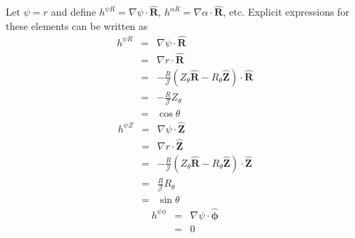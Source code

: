 \documentclass{article}
\newcommand{\tmmathbf}[1]{\ensuremath{\boldsymbol{#1}}}
\begin{document}
Let $\psi = r$ and define $h^{\psi R} = \nabla \psi \cdot \hat{\mathbf{R}}$,
$h^{\alpha R} = \nabla \alpha \cdot \hat{\mathbf{R}}$, etc. Explicit
expressions for these elements can be written as
\begin{eqnarray}
  h^{\psi R} & = & \nabla \psi \cdot \hat{\mathbf{R}} \nonumber\\
  & = & \nabla r \cdot \hat{\mathbf{R}} \nonumber\\
  & = & - \frac{R}{\mathcal{J}} (Z_{\theta} \hat{\mathbf{R}} - R_{\theta}
  \hat{\mathbf{Z}}) \cdot \hat{\mathbf{R}} \nonumber\\
  & = & - \frac{R}{\mathcal{J}} Z_{\theta} \nonumber\\
  & = & \cos \theta 
\end{eqnarray}
\begin{eqnarray*}
  h^{\psi Z} & = & \nabla \psi \cdot \hat{\mathbf{Z}}\\
  & = & \nabla r \cdot \hat{\mathbf{Z}}\\
  & = & - \frac{R}{\mathcal{J}} (Z_{\theta} \hat{\mathbf{R}} - R_{\theta}
  \hat{\mathbf{Z}}) \cdot \hat{\mathbf{Z}}\\
  & = & \frac{R}{\mathcal{J}} R_{\theta}\\
  & = & \sin \theta
\end{eqnarray*}
\begin{eqnarray*}
  h^{\psi \phi} & = & \nabla \psi \cdot \hat{\tmmathbf{\phi}}\\
  & = & 0
\end{eqnarray*}
\end{document}
